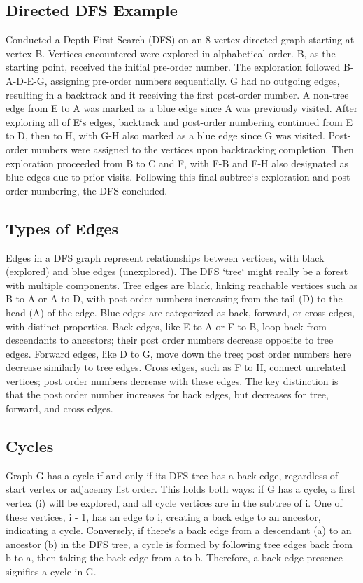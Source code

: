 \subsection*{Directed DFS  Example}
Conducted a Depth-First Search (DFS) on an 8-vertex directed graph starting at vertex B\@.
Vertices encountered were explored in alphabetical order.
B, as the starting point, received the initial pre-order number.
The exploration followed B-A-D-E-G, assigning pre-order numbers sequentially.
G had no outgoing edges, resulting in a backtrack and it receiving the first post-order number.
A non-tree edge from E to A was marked as a blue edge since A was previously visited.
After exploring all of E`s edges, backtrack and post-order numbering continued from E to D, then to H, with G-H also marked as a blue edge since G was visited.
Post-order numbers were assigned to the vertices upon backtracking completion.
Then exploration proceeded from B to C and F, with F-B and F-H also designated as blue edges due to prior visits.
Following this final subtree`s exploration and post-order numbering, the DFS concluded.

\subsection*{Types of Edges}
Edges in a DFS graph represent relationships between vertices, with black (explored) and blue edges (unexplored).
The DFS `tree` might really be a forest with multiple components.
Tree edges are black, linking reachable vertices such as B to A or A to D, with post order numbers increasing from the tail (D) to the head (A) of the edge.
Blue edges are categorized as back, forward, or cross edges, with distinct properties.
Back edges, like E to A or F to B, loop back from descendants to ancestors; their post order numbers decrease opposite to tree edges.
Forward edges, like D to G, move down the tree; post order numbers here decrease similarly to tree edges.
Cross edges, such as F to H, connect unrelated vertices; post order numbers decrease with these edges.
The key distinction is that the post order number increases for back edges, but decreases for tree, forward, and cross edges.

\subsection*{Cycles}
Graph G has a cycle if and only if its DFS tree has a back edge, regardless of start vertex or adjacency list order.
This holds both ways: if G has a cycle, a first vertex (i) will be explored, and all cycle vertices are in the subtree of i.
One of these vertices, i - 1, has an edge to i, creating a back edge to an ancestor, indicating a cycle.
Conversely, if there`s a back edge from a descendant (a) to an ancestor (b) in the DFS tree, a cycle is formed by following tree edges back from b to a, then taking the back edge from a to b.
Therefore, a back edge presence signifies a cycle in G\@.

